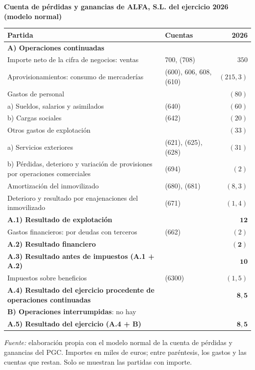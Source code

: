 \documentclass[10pt,a4paper]{article}
\begin{document}
\begin{center}\begin{minipage}{\linewidth}\centering
{\small\textbf{Cuenta de pérdidas y ganancias de ALFA, S.L. del ejercicio 2026 (modelo normal)}}\par\vspace{0.3em}
{\footnotesize
\begin{tabular}{p{9.4cm} p{3.6cm} r}
\hline
\textbf{Partida} & \textbf{Cuentas} & \textbf{2026} \\
\hline
\multicolumn{3}{l}{\textbf{A) Operaciones continuadas}} \tabularnewline
Importe neto de la cifra de negocios: ventas & \raggedright 700, (708) & $350$ \tabularnewline
Aprovisionamientos: consumo de mercaderías & \raggedright (600), 606, 608, (610) & $(215,3)$ \tabularnewline
Gastos de personal & & $(80)$ \tabularnewline
\quad a) Sueldos, salarios y asimilados & \raggedright (640) & $(60)$ \tabularnewline
\quad b) Cargas sociales & \raggedright (642) & $(20)$ \tabularnewline
Otros gastos de explotación & & $(33)$ \tabularnewline
\quad a) Servicios exteriores & \raggedright (621), (625), (628) & $(31)$ \tabularnewline
\quad b) Pérdidas, deterioro y variación de provisiones por operaciones comerciales & \raggedright (694) & $(2)$ \tabularnewline
Amortización del inmovilizado & \raggedright (680), (681) & $(8,3)$ \tabularnewline
Deterioro y resultado por enajenaciones del inmovilizado & \raggedright (671) & $(1,4)$ \tabularnewline
\textbf{A.1) Resultado de explotación} & & $\mathbf{12}$ \tabularnewline
Gastos financieros: por deudas con terceros & \raggedright (662) & $(2)$ \tabularnewline
\textbf{A.2) Resultado financiero} & & $\mathbf{(2)}$ \tabularnewline
\textbf{A.3) Resultado antes de impuestos (A.1 + A.2)} & & $\mathbf{10}$ \tabularnewline
Impuestos sobre beneficios & \raggedright (6300) & $(1,5)$ \tabularnewline
\textbf{A.4) Resultado del ejercicio procedente de operaciones continuadas} & & $\mathbf{8,5}$ \tabularnewline
\multicolumn{3}{l}{\textbf{B) Operaciones interrumpidas}: no hay} \tabularnewline
\textbf{A.5) Resultado del ejercicio (A.4 + B)} & & $\mathbf{8,5}$ \tabularnewline
\hline
\end{tabular}}\par\vspace{0.3em}
{\small\textit{Fuente: }elaboración propia con el modelo normal de la cuenta de pérdidas y ganancias del PGC. Importes en miles de euros; entre paréntesis, los gastos y las cuentas que restan. Solo se muestran las partidas con importe.}
\end{minipage}\end{center}
\end{document}

